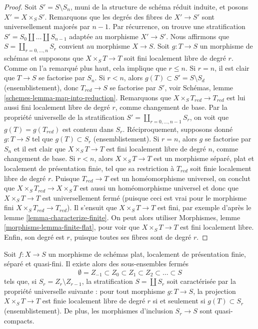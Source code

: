 \begin{proof}
\medskip\noindent
Soit $S' = S \setminus S_n$, muni de la structure de schéma réduit induite,
et posons $X' = X \times_S S'$. Remarquons que les degrés des fibres
de $X' \to S'$ sont universellement majorés par $n - 1$. Par récurrence, on trouve une
stratification $S' = S_0 \amalg \ldots \amalg S_{n - 1}$ adaptée
au morphisme $X' \to S'$. Nous affirmons que $S = \coprod_{r = 0, \ldots, n} S_r$
convient au morphisme $X \to S$. Soit $g : T \to S$ un morphisme de schémas
et supposons que $X \times_S T \to T$ soit fini localement libre de degré $r$.
Comme on l'a remarqué plus haut, cela implique que $r \leq n$. Si $r = n$, il est
clair que $T \to S$ se factorise par $S_n$. Si $r < n$, alors
$g(T) \subset S' = S \setminus S_d$ (ensemblistement), donc
$T_{red} \to S$ se factorise par $S'$, voir
Schémas, lemme \ref{schemes-lemma-map-into-reduction}.
Remarquons que $X \times_S T_{red} \to T_{red}$ est lui aussi
fini localement libre de degré $r$, comme changement de base.
Par la propriété universelle de la stratification
$S' = \coprod_{r = 0, \ldots, n - 1} S_r$, on voit que $g(T) = g(T_{red})$
est contenu dans $S_r$.
Réciproquement, supposons donné $g : T \to S$ tel que
$g(T) \subset S_r$ (ensemblistement).
Si $r = n$, alors $g$ se factorise par $S_n$ et
il est clair que $X \times_S T \to T$
est fini localement libre de degré $n$, comme changement de base.
Si $r < n$, alors $X \times_S T \to T$ est un morphisme
séparé, plat et localement de présentation finie, tel que
sa restriction à $T_{red}$ soit finie localement libre de degré $r$.
Puisque $T_{red} \to T$ est un homéomorphisme universel, on conclut
que $X \times_S T_{red} \to X \times_S T$ est aussi un homéomorphisme universel
et donc que $X \times_S T \to T$ est universellement fermé (puisque ceci
est vrai pour le morphisme fini $X \times_S T_{red} \to T_{red}$).
Il s'ensuit que $X \times_S T \to T$ est fini, par exemple d'après le
lemme \ref{lemma-characterize-finite}. On peut alors utiliser
Morphismes, lemme \ref{morphisms-lemma-finite-flat},
pour voir que $X \times_S T \to T$ est fini localement libre.
Enfin, son degré est $r$, puisque toutes ses fibres sont de degré $r$.
\end{proof}

\begin{lemma}
\label{lemma-stratify-flat-fp-qf}
Soit $f : X \to S$ un morphisme de schémas plat, localement de
présentation finie, séparé et quasi-fini. Il existe alors
des sous-ensembles fermés
$$
\emptyset = Z_{-1} \subset Z_0 \subset Z_1 \subset Z_2 \subset
\ldots \subset S
$$
tels que, si $S_r = Z_r \setminus Z_{r - 1}$, la stratification
$S = \coprod S_r$ soit caractérisée par la propriété universelle suivante :
pour tout morphisme $g : T \to S$, la projection $X \times_S T \to T$ est
finie localement libre de degré $r$ si et seulement si $g(T) \subset S_r$
(ensemblistement). De plus, les morphismes d'inclusion $S_r \to S$ sont
quasi-compacts.
\end{lemma}

